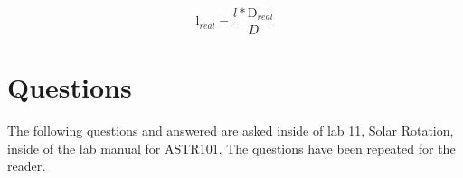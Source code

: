 \documentclass{article}
\begin{document}
\begin{equation}
\label{eq:size}
\text{l}_{real} = \frac{l * \text{D}_{real}}{D}
\end{equation}



\section{Questions}

The following questions and answered are asked inside of lab 11, Solar Rotation, inside of the lab manual
for ASTR101. The questions have been repeated for the reader.
\end{document}
